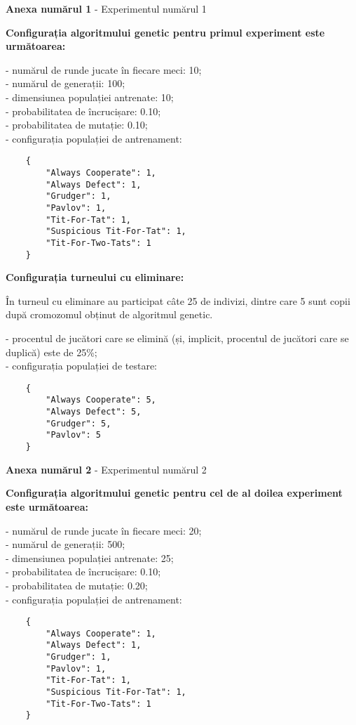 \begin{center}
	\textbf{Anexa numărul 1} - Experimentul numărul 1
\end{center}

\textbf{Configurația algoritmului genetic pentru primul experiment este următoarea:}

- numărul de runde jucate în fiecare meci: 10;\\
- numărul de generații: 100;\\
- dimensiunea populației antrenate: 10;\\
- probabilitatea de încrucișare: 0.10;\\
- probabilitatea de mutație: 0.10;\\
- configurația populației de antrenament:\\
\begin{center}
	\begin{lstlisting}
	{
		"Always Cooperate": 1,
		"Always Defect": 1,
		"Grudger": 1,
		"Pavlov": 1,
		"Tit-For-Tat": 1,
		"Suspicious Tit-For-Tat": 1,
		"Tit-For-Two-Tats": 1
	}
\end{lstlisting}
\end{center}
 
\textbf{Configurația turneului cu eliminare:}

În turneul cu eliminare au participat câte 25 de indivizi, dintre care 5 sunt copii după cromozomul obținut de algoritmul genetic. 

- procentul de jucători care se elimină (și, implicit, procentul de jucători care se duplică) este de 25\%;\\
- configurația populației de testare:\\
\begin{center}
	\begin{lstlisting}
	{
		"Always Cooperate": 5,
		"Always Defect": 5,
		"Grudger": 5,
		"Pavlov": 5
	}
	\end{lstlisting}
\end{center}

\clearpage

\begin{center}
	\textbf{Anexa numărul 2} - Experimentul numărul 2
\end{center}

\textbf{Configurația algoritmului genetic pentru cel de al doilea experiment este următoarea:}

- numărul de runde jucate în fiecare meci: 20;\\
- numărul de generații: 500;\\
- dimensiunea populației antrenate: 25;\\
- probabilitatea de încrucișare: 0.10;\\
- probabilitatea de mutație: 0.20;\\
- configurația populației de antrenament:\\
\begin{center}
	\begin{lstlisting}
	{
		"Always Cooperate": 1,
		"Always Defect": 1,
		"Grudger": 1,
		"Pavlov": 1,
		"Tit-For-Tat": 1,
		"Suspicious Tit-For-Tat": 1,
		"Tit-For-Two-Tats": 1
	}
	\end{lstlisting}
\end{center}

